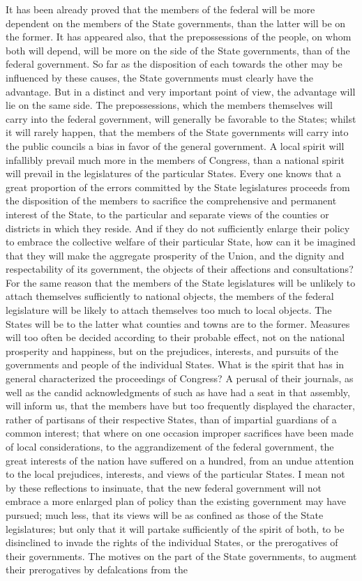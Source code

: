 It has been already proved that the members of the federal will be more dependent on the members of the State governments, than the latter will be on the former. It has appeared also, that the prepossessions of the people, on whom both will depend, will be more on the side of the State governments, than of the federal government. So far as the disposition of each towards the other may be influenced by these causes, the State governments must clearly have the advantage. But in a distinct and very important point of view, the advantage will lie on the same side. The prepossessions, which the members themselves will carry into the federal government, will generally be favorable to the States; whilst it will rarely happen, that the members of the State governments will carry into the public councils a bias in favor of the general government. A local spirit will infallibly prevail much more in the members of Congress, than a national spirit will prevail in the legislatures of the particular States. Every one knows that a great proportion of the errors committed by the State legislatures proceeds from the disposition of the members to sacrifice the comprehensive and permanent interest of the State, to the particular and separate views of the counties or districts in which they reside. And if they do not sufficiently enlarge their policy to embrace the collective welfare of their particular State, how can it be imagined that they will make the aggregate prosperity of the Union, and the dignity and respectability of its government, the objects of their affections and consultations? For the same reason that the members of the State legislatures will be unlikely to attach themselves sufficiently to national objects, the members of the federal legislature will be likely to attach themselves too much to local objects. The States will be to the latter what counties and towns are to the former. Measures will too often be decided according to their probable effect, not on the national prosperity and happiness, but on the prejudices, interests, and pursuits of the governments and people of the individual States. What is the spirit that has in general characterized the proceedings of Congress? A perusal of their journals, as well as the candid acknowledgments of such as have had a seat in that assembly, will inform us, that the members have but too frequently displayed the character, rather of partisans of their respective States, than of impartial guardians of a common interest; that where on one occasion improper sacrifices have been made of local considerations, to the aggrandizement of the federal government, the great interests of the nation have suffered on a hundred, from an undue attention to the local prejudices, interests, and views of the particular States. I mean not by these reflections to insinuate, that the new federal government will not embrace a more enlarged plan of policy than the existing government may have pursued; much less, that its views will be as confined as those of the State legislatures; but only that it will partake sufficiently of the spirit of both, to be disinclined to invade the rights of the individual States, or the prerogatives of their governments. The motives on the part of the State governments, to augment their prerogatives by defalcations from the 